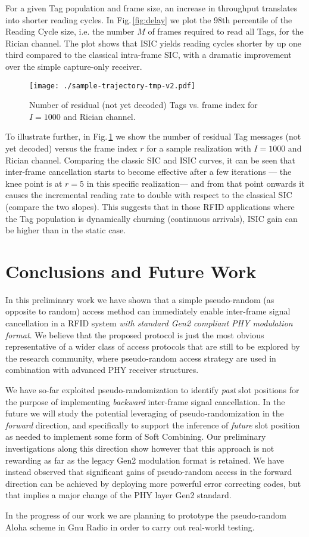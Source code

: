 \documentclass[12pt,draftcls,onecolumn]{IEEEtran}
\begin{document}
For a given Tag population and frame size, an increase in throughput  translates into shorter reading cycles. In Fig.\,\ref{fig:delay} we plot the 98th percentile of the Reading Cycle size, i.e. the number $M$ of frames required to read all Tags, for the Rician channel. The plot shows that ISIC yields reading cycles shorter by up one third compared to the classical intra-frame SIC, with a dramatic improvement over the simple capture-only receiver. 



 \begin{figure}[tb]
\centering
\texttt{[image: ./sample-trajectory-tmp-v2.pdf]}

\caption{Number of residual (not yet decoded) Tags vs. frame index for $I=1000$ and Rician channel.  }
\label{fig:realizzazione}
\end{figure}

To illustrate further, in Fig.\,\ref{fig:realizzazione} we show the number of residual Tag messages (not yet decoded) versus the frame index $r$ for a sample realization  with $I=1000$ and Rician channel.
Comparing the classic SIC and ISIC curves, it can be seen that inter-frame cancellation starts to become effective after a few iterations --- the knee point is at $r=5$ in this specific realization--- and from that point onwards it causes the  incremental reading rate to double with respect to the classical SIC (compare the two slopes). This suggests that in those RFID applications where the Tag population is dynamically churning (continuous arrivals), ISIC gain can be higher than in the static case.



\section{Conclusions and Future Work}


In this preliminary work we have shown that a simple pseudo-random (as opposite to random) access method can immediately enable inter-frame signal cancellation in a RFID system \emph{with standard Gen2 compliant PHY modulation format}.
We believe that the proposed protocol is just the most obvious representative of a wider class of  access protocols that are still to be explored by the research community, where pseudo-random access strategy are used in combination with advanced  PHY receiver structures.

We have so-far exploited pseudo-randomization to identify \emph{past} slot positions for the purpose of implementing \emph{backward} inter-frame signal cancellation. In the future we will study the potential leveraging of pseudo-randomization in the \emph{forward} direction, and specifically to support the inference of \emph{future} slot position as needed to implement some form of Soft Combining. Our preliminary investigations along this direction show however that this approach is not rewarding as far as the legacy Gen2 modulation  format is retained. We have instead observed that significant gains of pseudo-random access in the forward direction can be achieved by deploying more powerful error correcting codes, but that implies a major change of the  PHY layer Gen2 standard.

In the progress of our work we are planning to prototype the pseudo-random Aloha scheme in Gnu Radio \cite{donno} in order to carry out real-world testing.







\end{document}
